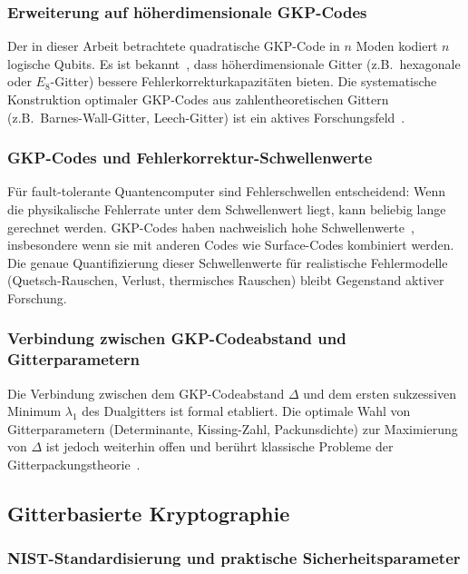 ﻿\documentclass[a4paper,12pt]{article}
\theoremstyle{definition}
\begin{document}
\subsubsection{Erweiterung auf höherdimensionale GKP-Codes}

Der in dieser Arbeit betrachtete quadratische GKP-Code in $n$ Moden kodiert $n$ logische Qubits.
Es ist bekannt~\cite{Harrington2001}, dass höherdimensionale Gitter (z.B.\ hexagonale oder
$E_8$-Gitter) bessere Fehlerkorrekturkapazitäten bieten.
Die systematische Konstruktion optimaler GKP-Codes aus zahlentheoretischen Gittern
(z.B.\ Barnes-Wall-Gitter, Leech-Gitter) ist ein aktives Forschungsfeld~\cite{Royer2022}.

\subsubsection{GKP-Codes und Fehlerkorrektur-Schwellenwerte}

Für fault-tolerante Quantencomputer sind Fehlerschwellen entscheidend:
Wenn die physikalische Fehlerrate unter dem Schwellenwert liegt, kann beliebig
lange gerechnet werden.
GKP-Codes haben nachweislich hohe Schwellenwerte~\cite{Menicucci2014},
insbesondere wenn sie mit anderen Codes wie Surface-Codes kombiniert werden.
Die genaue Quantifizierung dieser Schwellenwerte für realistische Fehlermodelle
(Quetsch-Rauschen, Verlust, thermisches Rauschen) bleibt Gegenstand aktiver Forschung.

\subsubsection{Verbindung zwischen GKP-Codeabstand und Gitterparametern}

Die Verbindung zwischen dem GKP-Codeabstand $\Delta$ und dem ersten sukzessiven Minimum
$\lambda_1$ des Dualgitters ist formal etabliert.
Die optimale Wahl von Gitterparametern (Determinante, Kissing-Zahl, Packunsdichte)
zur Maximierung von $\Delta$ ist jedoch weiterhin offen und berührt klassische Probleme
der Gitterpackungstheorie~\cite{ConwaySloane1993}.

\subsection{Gitterbasierte Kryptographie}

\subsubsection{NIST-Standardisierung und praktische Sicherheitsparameter}
\end{document}
